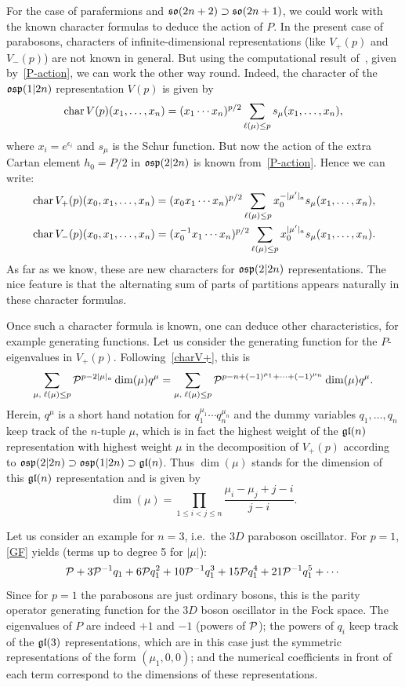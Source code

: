 \documentclass{SciPost}
\begin{document}
For the case of parafermions and $\mathfrak{so}(2n+2)\supset\mathfrak{so}(2n+1)$, we could work with the known character formulas to deduce the action of $P$.
In the present case of parabosons, characters of infinite-dimensional representations (like $V_+(p)$ and $V_-(p)$) are not known in general.
But using the computational result of~\cite{SV2026}, given by~\eqref{P-action}, we can work the other way round.
Indeed, the character of the $\mathfrak{osp}(1|2n)$ representation $V(p)$ is given by~\cite{paraboson}
\[
\mathop{\rm char}\nolimits V(p)(x_1,\ldots,x_n)=(x_1\cdots x_{n})^{p/2} \sum_{\ell(\mu)\leq p} s_\mu(x_1,\ldots,x_n),
\]
where $x_i=e^{\epsilon_i}$ and $s_\mu$ is the Schur function.
But now the action of the extra Cartan element $h_0=P/2$ in $\mathfrak{osp}(2|2n)$ is known from~\eqref{P-action}.
Hence we can write:
\begin{align}
&\mathop{\rm char}\nolimits V_+(p)({x_0},x_1,\ldots,x_n)=({x_0}x_1\cdots x_{n})^{p/2} \sum_{\ell(\mu)\leq p} {x_0^{-|\mu'|_a}}s_\mu(x_1,\ldots,x_n), \label{charV+}\\
&\mathop{\rm char}\nolimits V_-(p)({x_0},x_1,\ldots,x_n)=({x_0^{-1}}x_1\cdots x_{n})^{p/2} \sum_{\ell(\mu)\leq p} {x_0^{|\mu'|_a}}s_\mu(x_1,\ldots,x_n). \label{charV-}
\end{align}
As far as we know, these are new characters for $\mathfrak{osp}(2|2n)$ representations.
The nice feature is that the alternating sum of parts of partitions appears naturally in these character formulas.

Once such a character formula is known, one can deduce other characteristics, for example generating functions.
Let us consider the generating function for the $P$-eigenvalues in $V_+(p)$.
Following~\eqref{charV+}, this is
\begin{equation}
\sum_{\mu,\; \ell(\mu)\leq p} {\cal P}^{p-2|\mu|_a} \dim(\mu) q^\mu =
\sum_{\mu,\; \ell(\mu)\leq p} {\cal P}^{p-n+(-1)^{\mu_1}+\cdots +(-1)^{\mu_n}} \dim(\mu) q^\mu.
\label{GF}
\end{equation}
Herein, $q^\mu$ is a short hand notation for $q_1^{\mu_1}\cdots q_n^{\mu_n}$ and the dummy variables $q_1,\ldots,q_n$ keep track of the $n$-tuple $\mu$,
which is in fact the highest weight of the $\mathfrak{gl}(n)$ representation with highest weight $\mu$ in the decomposition of $V_+(p)$ according to $\mathfrak{osp}(2|2n)\supset\mathfrak{osp}(1|2n)\supset\mathfrak{gl}(n)$.
Thus $\dim(\mu)$ stands for the dimension of this $\mathfrak{gl}(n)$ representation and is given by
\[
\dim(\mu)= \prod_{1\leq i<j\leq n} \frac{\mu_i-\mu_j+j-i}{j-i}.
\]

Let us consider an example for $n=3$, i.e.\ the $3D$ paraboson oscillator.
For $p=1$, \eqref{GF} yields (terms up to degree 5 for $|\mu|$):
\[
{\cal P}+ 3{\cal P}^{-1}q_1+ 6{\cal P}q_1^2+ 10{\cal P}^{-1}q_1^3+ 15{\cal P}q_1^4+ 21{\cal P}^{-1}q_1^5 + \cdots
\]
Since for $p=1$ the parabosons are just ordinary bosons, this is the parity operator generating function for the $3D$ boson oscillator in the Fock space.
The eigenvalues of $P$ are indeed $+1$ and $-1$ (powers of ${\cal P}$); 
the powers of $q_i$ keep track of the $\mathfrak{gl}(3)$ representations, which are in this case just the symmetric representations of the form $(\mu_1,0,0)$;
and the numerical coefficients in front of each term correspond to the dimensions of these representations.
\end{document}
